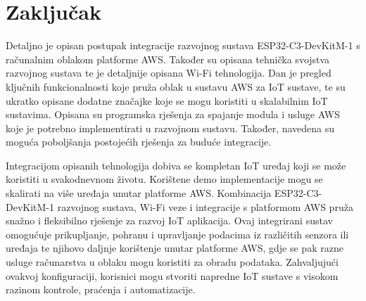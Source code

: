 \chapter{Zaključak}

Detaljno je opisan postupak integracije razvojnog sustava ESP32-C3-DevKitM-1 s računalnim oblakom platforme AWS. Također su opisana tehnička svojstva razvojnog sustava te je detaljnije opisana Wi-Fi tehnologija. Dan je pregled ključnih funkcionalnosti koje pruža oblak u sustavu AWS za IoT sustave, te su ukratko opisane dodatne značajke koje se mogu koristiti u skalabilnim IoT sustavima. Opisana su programska rješenja za spajanje modula i usluge AWS koje je potrebno implementirati u razvojnom sustavu. Također, navedena su moguća poboljšanja postojećih rješenja za buduće integracije.

Integracijom opisanih tehnologija dobiva se kompletan IoT uređaj koji se može koristiti u svakodnevnom životu. Korištene demo implementacije mogu se skalirati na više uređaja unutar platforme AWS. Kombinacija ESP32-C3-DevKitM-1 razvojnog sustava, Wi-Fi veze i integracije s platformom AWS pruža snažno i fleksibilno rješenje za razvoj IoT aplikacija. Ovaj integrirani sustav omogućuje prikupljanje, pohranu i upravljanje
podacima iz različitih senzora ili uređaja te njihovo daljnje korištenje unutar platforme AWS, gdje se pak razne usluge računarstva u oblaku mogu koristiti za obradu podataka. Zahvaljujući ovakvoj konfiguraciji, korisnici mogu stvoriti napredne IoT sustave s visokom razinom kontrole, praćenja i automatizacije.

\eject